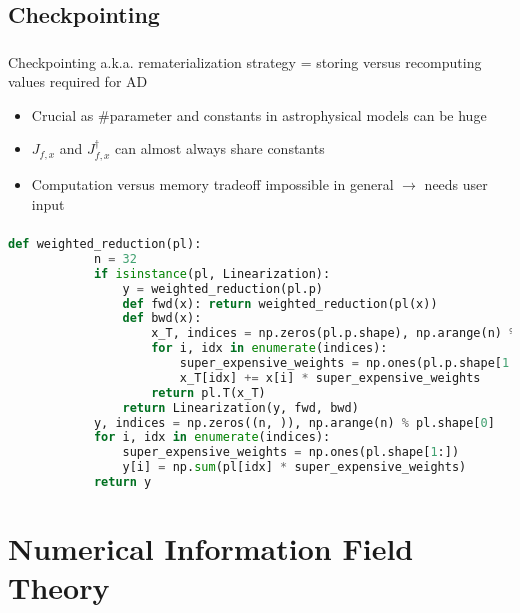 \documentclass[aspectratio=169,xcolor=dvipsnames]{beamer}
\begin{document}
\subsection{Checkpointing}
\begin{frame}
	\frametitle{\insertsection}
	\framesubtitle{\insertsubsection}

	Checkpointing a.k.a. rematerialization strategy = storing versus recomputing values required for AD

	\begin{itemize}
		\item Crucial as \#parameter and constants in astrophysical models can be huge
		\item $J_{f,x}$ and $J_{f,x}^\dagger$ can almost always share constants
		\item Computation versus memory tradeoff impossible in general $\rightarrow$ needs user input
	\end{itemize}

\end{frame}

\begin{frame}[fragile]
	\frametitle{\insertsection}
	\framesubtitle{\insertsubsection}

	\vspace{-1em}
	\begin{lstlisting}[language=python,escapechar=!]
		def weighted_reduction(pl):
			n = 32
			if isinstance(pl, Linearization):
				y = weighted_reduction(pl.p)
				def fwd(x): return weighted_reduction(pl(x))
				def bwd(x):
					x_T, indices = np.zeros(pl.p.shape), np.arange(n) % pl.p.shape[0]
					for i, idx in enumerate(indices):
						super_expensive_weights = np.ones(pl.p.shape[1:])
						x_T[idx] += x[i] * super_expensive_weights
					return pl.T(x_T)
				return Linearization(y, fwd, bwd)
			y, indices = np.zeros((n, )), np.arange(n) % pl.shape[0]
			for i, idx in enumerate(indices):
				super_expensive_weights = np.ones(pl.shape[1:])
				y[i] = np.sum(pl[idx] * super_expensive_weights)
			return y
	\end{lstlisting}
\end{frame}

\section{Numerical Information Field Theory}  %
\end{document}
